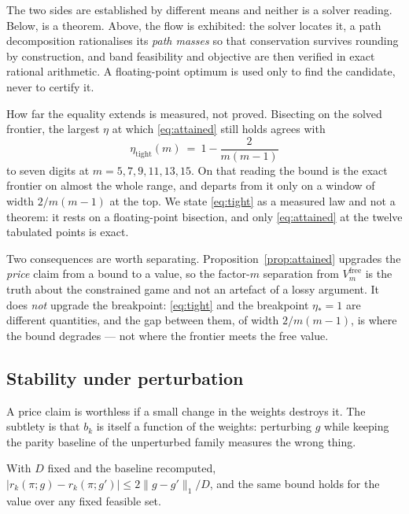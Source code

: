 The two sides are established by different means and neither is a solver reading. Below,
 is a theorem. Above, the flow is exhibited: the solver
locates it, a path decomposition rationalises its \emph{path masses} so that conservation
survives rounding by construction, and band feasibility and objective are then verified in
exact rational arithmetic. A floating-point optimum is used only to find the candidate,
never to certify it.

How far the equality extends is measured, not proved. Bisecting on the solved frontier, the
largest $\eta$ at which \eqref{eq:attained} still holds agrees with
\begin{equation}
\eta_{\mathrm{tight}}(m)\ =\ 1-\frac{2}{m(m-1)}
\label{eq:tight}
\end{equation}
to seven digits at $m=5,7,9,11,13,15$. On that reading the bound is the exact frontier on
almost the whole range, and departs from it only on a window of width $2/m(m-1)$ at the top.
We state \eqref{eq:tight} as a measured law and not a theorem: it rests on a
floating-point bisection, and only \eqref{eq:attained} at the twelve tabulated points is
exact.

Two consequences are worth separating. Proposition~\ref{prop:attained} upgrades the
\emph{price} claim from a bound to a value, so the factor-$m$ separation from
$V^{\mathrm{free}}_{m}$ is the truth about the constrained game and not an artefact of a
lossy argument. It does \emph{not} upgrade the breakpoint: \eqref{eq:tight} and the
breakpoint $\eta_{*}=1$ are different quantities, and the gap between them, of width
$2/m(m-1)$, is where the bound degrades --- not where the frontier meets the free value.

\subsection{Stability under perturbation}

A price claim is worthless if a small change in the weights destroys it. The subtlety is
that $b_{k}$ is itself a function of the weights: perturbing $g$ while keeping the parity
baseline of the unperturbed family measures the wrong thing.

\begin{theorem}[Stability]
\label{thm:stab}
With $D$ fixed and the baseline recomputed,
$\bigl|r_{k}(\pi;g)-r_{k}(\pi;g')\bigr|\le 2\|g-g'\|_{1}/D$, and the same bound holds for the
value over any fixed feasible set.
\end{theorem}

